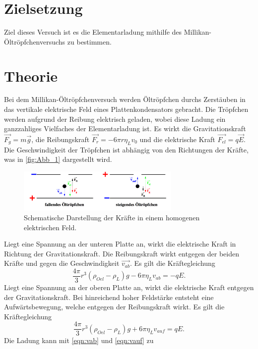 \section{Zielsetzung}
\label{sec:Zielsetzung}
Ziel dieses Versuch ist es die Elementarladung mithilfe des Millikan-Öltröpfchenversuchs zu bestimmen.
\section{Theorie}
\label{sec:Theorie}
Bei dem Millikan-Öltröpfchenversuch werden Öltröpfchen durchs Zerstäuben in das vertikale
elektrische Feld eines Plattenkondensators gebracht. Die Tröpfchen werden aufgrund der Reibung
elektrisch geladen, wobei diese Ladung ein ganzzahliges Vielfaches der Elementarladung ist.
Es wirkt die Gravitationskraft $\vec{F_g}=m \vec{g}$, die Reibungskraft 
$\vec{F_r} = - 6 \pi r \eta_L v_0$ und die elektrische Kraft $\vec{F_{el}} = q \vec{E}$.
Die Geschwindigkeit der Tröpfchen ist abhängig von den Richtungen der Kräfte, was in \autoref{fig:Abb_1} dargestellt wird.
\begin{figure}[H]
    \centering
    \includegraphics[width=0.7\textwidth]{Abbildungen/Abb_1.pdf}
    \caption {Schematische Darstellung der Kräfte in einem homogenen elektrischen Feld\cite[1]{V503}.}
    \label{fig:Abb_1}
\end{figure}
Liegt eine Spannung an der unteren Platte an, wirkt die elektrische Kraft in Richtung der Gravitationskraft.
Die Reibungskraft wirkt entgegen der beiden Kräfte und gegen die Geschwindigkeit $\vec{v_{ab}}$.
Es gilt die Kräftegleichung
\begin{equation}
    \frac{4 \pi}{3} r^3 (\rho_{Oel}-\rho_L)g - 6 \pi \eta_L v_{ab} = - q E.
    \label{eqn:vab}
\end{equation}
Liegt eine Spannung an der oberen Platte an, wirkt die elektrische Kraft entgegen der Gravitationskraft.
Bei hinreichend hoher Feldstärke entsteht eine Aufwärtsbewegung, welche entgegen der Reibungskraft wirkt.
Es gilt die Kräftegleichung
\begin{equation}
    \frac{4\pi}{3} r^3 (\rho_{Oel}-\rho_L) g + 6 \pi \eta_L v_{auf} = q E.
    \label{eqn:vauf}
\end{equation}
Die Ladung kann mit \autoref{eqn:vab} und \autoref{eqn:vauf} zu
